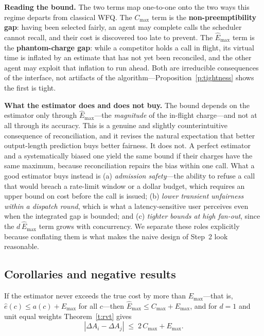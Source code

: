 \documentclass[letterpaper,11pt,leqno]{article}
\begin{document}
\textbf{Reading the bound.} The two terms map one-to-one onto the two ways this regime departs from classical WFQ. The $C_{\max}$ term is the \textbf{non-preemptibility gap}: having been selected fairly, an agent may complete calls the scheduler cannot recall, and their cost is discovered too late to prevent. The $\hat{E}_{\max}$ term is the \textbf{phantom-charge gap}: while a competitor holds a call in flight, its virtual time is inflated by an estimate that has not yet been reconciled, and the other agent may exploit that inflation to run ahead. Both are irreducible consequences of the interface, not artifacts of the algorithm---Proposition~\ref{p:tightness} shows the first is tight.

\textbf{What the estimator does and does not buy.} The bound depends on the estimator only through $\hat{E}_{\max}$---the \emph{magnitude} of the in-flight charge---and not at all through its accuracy. This is a genuine and slightly counterintuitive consequence of reconciliation, and it revises the natural expectation that better output-length prediction buys better fairness. It does not. A perfect estimator and a systematically biased one yield the same bound if their charges have the same maximum, because reconciliation repairs the bias within one call. What a good estimator buys instead is (a) \emph{admission safety}---the ability to refuse a call that would breach a rate-limit window or a dollar budget, which requires an upper bound on cost before the call is issued; (b) \emph{lower transient unfairness within a dispatch round}, which is what a latency-sensitive user perceives even when the integrated gap is bounded; and (c) \emph{tighter bounds at high fan-out}, since the $d\,\hat{E}_{\max}$ term grows with concurrency. We separate these roles explicitly because conflating them is what makes the naive design of Step~2 look reasonable.

\subsection{Corollaries and negative results}\label{s:corollaries}

\begin{corollary}\label{c:estimator}
If the estimator never exceeds the true cost by more than $E_{\max}$---that is, $\hat{e}(c) \le a(c) + E_{\max}$ for all $c$---then $\hat{E}_{\max} \le C_{\max} + E_{\max}$, and for $d = 1$ and unit equal weights Theorem~\ref{t:rvt} gives
\[
  \left|\Delta A_i - \Delta A_j\right| \;\le\; 2\,C_{\max} + E_{\max}.
\]
\end{corollary}
\end{document}
